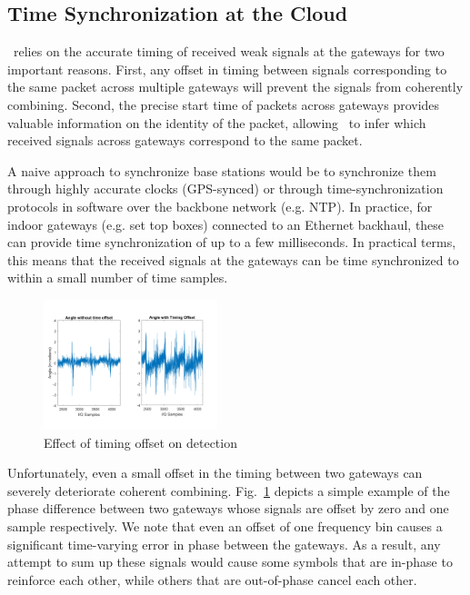\subsection{Time Synchronization at the Cloud}
\name\ relies on the accurate timing of received weak signals at the gateways for two important reasons. First, any offset in timing between signals corresponding to the same packet across multiple gateways will prevent the signals from coherently combining. Second, the precise start time of packets across gateways provides valuable information on the identity of the packet, allowing \name\ to infer which received signals across gateways correspond to the same packet.

A naive approach to synchronize base stations would be to synchronize them through highly accurate clocks (GPS-synced) or through time-synchronization protocols in software over the backbone network (e.g. NTP). In practice, for indoor gateways (e.g. set top boxes) connected to an Ethernet backhaul, these can provide time synchronization of up to a few milliseconds. In practical terms, this means that the received signals at the gateways can be time synchronized to within a small number of time samples. 

\begin{figure}
    \centering
    \includegraphics[width=0.45\textwidth]{location-aware-network/figures/TimeOffset.pdf}
    \caption{Effect of timing offset on detection}
    \label{fig:toffset}
\end{figure}

Unfortunately, even a small offset in the timing between two gateways can severely deteriorate coherent combining. Fig.~\ref{fig:toffset} depicts a simple example of the phase difference between two gateways whose signals are offset by zero and one sample respectively. We note that even an offset of one frequency bin causes a significant time-varying error in phase between the gateways. As a result, any attempt to sum up these signals would cause some symbols that are in-phase to reinforce each other, while others that are out-of-phase cancel each other. \vspace*{0.1in}


